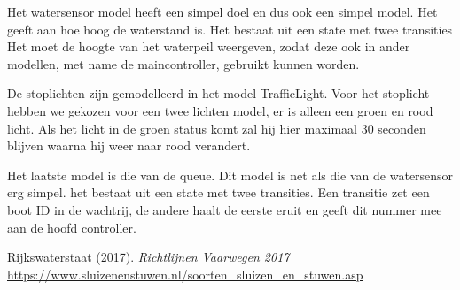 \documentclass{article}
\begin{document}
Het watersensor model heeft een simpel doel en dus ook een simpel model. Het geeft aan hoe hoog de waterstand is. Het bestaat uit een state met twee transities
 Het moet de hoogte van het waterpeil weergeven, zodat deze ook in ander modellen, met name de maincontroller, gebruikt kunnen worden.

De stoplichten zijn gemodelleerd in het model TrafficLight. Voor het stoplicht hebben we gekozen voor een twee lichten model, er is alleen een groen en rood licht. Als het licht in de groen status komt zal hij hier maximaal 30 seconden blijven waarna hij weer naar rood verandert.

Het laatste model is die van de queue. Dit model is net als die van de watersensor erg simpel. het bestaat uit een state met twee transities. Een transitie zet een boot ID in de wachtrij, de andere haalt de eerste eruit en geeft dit nummer mee aan de hoofd controller.


\clearpage %

\clearpage %
\begin{thebibliography}{9}
Rijkswaterstaat (2017).
\textit{Richtlijnen Vaarwegen 2017}\\

\url{https://www.sluizenenstuwen.nl/soorten_sluizen_en_stuwen.asp}


\end{thebibliography}
\end{document}
